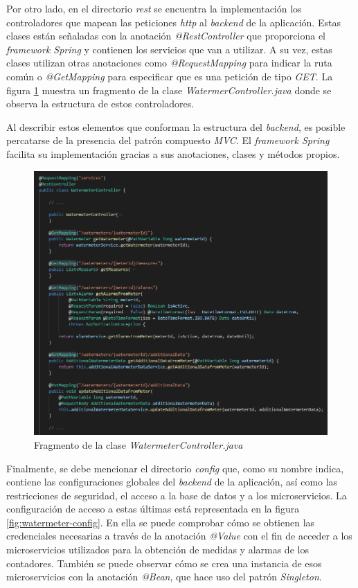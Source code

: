 \documentclass[pdftex,11pt,a4paper]{book}
\begin{document}
Por otro lado, en el directorio \textit{rest} se encuentra la implementación los controladores que mapean las peticiones \textit{http} al \textit{backend} de la aplicación. Estas clases están señaladas con la anotación \textit{@RestController} que proporciona el \textit{framework Spring} y contienen los servicios que van a utilizar. A su vez, estas clases utilizan otras anotaciones como \textit{@RequestMapping} para indicar la ruta común o \textit{@GetMapping} para especificar que es una petición de tipo \textit{GET}. La figura \ref{fig:watermeter-controller} muestra un fragmento de la clase \textit{WatermerController.java} donde se observa la estructura de estos controladores. 

Al describir estos elementos que conforman la estructura del \textit{backend}, es posible percatarse de la presencia del patrón compuesto \textit{MVC}. El \textit{framework Spring} facilita su implementación gracias a sus anotaciones, clases y métodos propios. 

 \begin{figure}[H]
 \centering
 \includegraphics [scale=0.65] {images/implementacion/watermeter-controller.png}
 \caption{Fragmento de la clase \textit{WatermeterController.java}} \label{fig:watermeter-controller}
 \end{figure}


Finalmente, se debe mencionar el directorio \textit{config} que, como su nombre indica, contiene las configuraciones globales del \textit{backend} de la aplicación, así como las restricciones de seguridad, el acceso a la base de datos y a los microservicios.  La configuración de acceso a estas últimas está representada en la figura \ref{fig:watermeter-config}. En ella se puede comprobar cómo se obtienen las credenciales necesarias a través de la anotación \textit{@Value} con el fin de acceder a los microservicios utilizados para la obtención de medidas y alarmas de los contadores. También se puede observar cómo se crea una instancia de esos microservicios con la anotación \textit{@Bean}, que hace uso del patrón \textit{Singleton}. 
\end{document}
